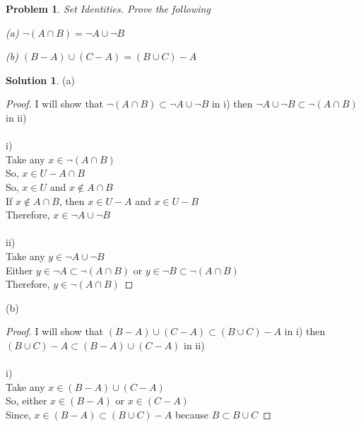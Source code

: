 \documentclass{article}
\newtheorem{problem}{Problem}
\theoremstyle{definition}
\newtheorem*{solution}{Solution}
\begin{document}
\begin{problem}

Set Identities. Prove the following

(a) \( \neg (A \cap B) = \neg A \cup \neg B \)

(b) \( (B-A)\cup (C-A)=(B\cup C)-A \)

\end{problem}

\begin{solution}

(a)

\begin{proof}

I will show that \( \neg (A \cap B) \subset \neg A \cup \neg B \) in i) 
then \( \neg A \cup \neg B \subset \neg (A \cap B) \) in ii) \\ \\

i) \\
Take any \(x \in \neg (A \cap B) \) \\
So, \(x \in U - A \cap B \) \\
So, \(x \in U \) and \(x \notin A \cap B \) \\
If \(x \notin A \cap B \), then \(x \in U - A \) and \(x \in U - B \) \\
Therefore, \(x \in \neg A \cup \neg B \) \\ \\

ii) \\
Take any \(y \in \neg A \cup \neg B \) \\
Either \(y \in \neg A \subset \neg (A \cap B) \) or \(y \in \neg B \subset \neg (A \cap B) \) \\
Therefore, \(y \in \neg (A \cap B) \)

\end{proof}

(b)

\begin{proof}

I will show that \( (B-A)\cup (C-A) \subset (B\cup C)-A \) in i) 
then \( (B\cup C)-A \subset (B-A)\cup (C-A) \) in ii) \\ \\

i) \\
Take any \(x \in (B-A)\cup (C-A) \) \\
So, either \(x \in (B-A) \) or \( x \in (C-A) \)\\
Since, \(x \in (B-A) \subset (B \cup C)-A \) because \(B \subset B \cup C \)


\end{proof}
\end{solution}
\end{document}
